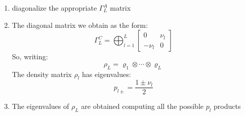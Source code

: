\documentclass[12pt,a4paper]{book}
\theoremstyle{definition}
\begin{document}
 \begin{enumerate}
 	\item diagonalize the appropriate $\Gamma^A_L$ matrix
 	\item The diagonal matrix we obtain as the form: \begin{equation}
 		\Gamma_{L}^{C}=\bigoplus_{l=1}^{L}\left[\begin{array}{cc}
 			0 & \nu_{l} \\
 			-\nu_{l} & 0
 		\end{array}\right]
 	\end{equation}
So, writing:
 	\begin{equation}
 		\rho_{L}=\varrho_{1} \otimes \cdots \otimes \varrho_{L}
 	\end{equation}
The density matrix $\rho_l$ has eigenvalues:
 \begin{equation}
 	p_{l\pm}=\frac{1 \pm \nu_{l}}{2}
 \end{equation}
\item The eigenvalues of $\rho_L$ are obtained computing all the possible $p_l$ products
\end{enumerate}
\end{document}
